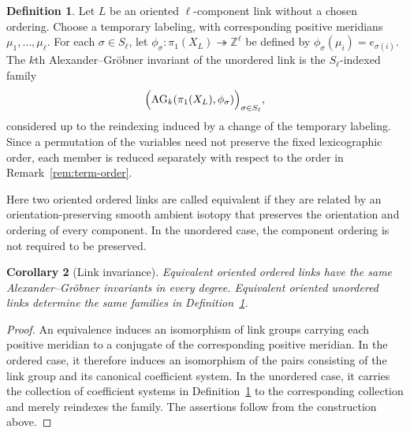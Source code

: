 \documentclass{article}
\theoremstyle{definition}
\newtheorem{definition}{Definition}[section]
\theoremstyle{plain}
\newtheorem{corollary}[definition]{Corollary}
\newcommand{\AG}{\mathrm{AG}}
\newcommand{\Z}{\mathbb{Z}}
\begin{document}
\begin{definition}\label{def:unordered-link-AG}
Let \(L\) be an oriented \(\ell\)-component link without a chosen ordering.
Choose a temporary labeling, with corresponding positive meridians
\(\mu_1,\dots,\mu_\ell\). For each \(\sigma\in S_\ell\), let
\(\phi_\sigma\colon\pi_1(X_L)\twoheadrightarrow\Z^\ell\) be defined by
\(\phi_\sigma(\mu_i)=e_{\sigma(i)}\). 
The \(k\)th Alexander--Gr\"obner invariant of the unordered link
is the \(S_\ell\)-indexed family
\[
\Bigl(
\AG_k(\pi_1(X_L),\phi_\sigma)
\Bigr)_{\sigma\in S_\ell},
\]
considered up to the reindexing induced by a change of the
temporary labeling. Since a
permutation of the variables need not preserve the fixed lexicographic
order, each member is reduced separately with respect to the order in
Remark~\ref{rem:term-order}.
\end{definition}
Here two oriented ordered links are called equivalent if they are
related by an orientation-preserving smooth ambient isotopy that
preserves the orientation and ordering of every component. In the
unordered case, the component ordering is not required to be preserved.
\begin{corollary}[Link invariance]\label{cor:link-invariant}
Equivalent oriented ordered links have the same Alexander--Gr\"obner
invariants in every degree. Equivalent oriented unordered links determine
the same families in Definition~\ref{def:unordered-link-AG}.
\end{corollary}

\begin{proof}
An equivalence induces an isomorphism of link groups carrying each positive
meridian to a conjugate of the corresponding positive meridian. In the
ordered case, it therefore induces an isomorphism of the pairs consisting
of the link group and its canonical coefficient system. In the unordered
case, it carries the collection of coefficient systems in
Definition~\ref{def:unordered-link-AG} to the corresponding collection and
merely reindexes the family. The assertions follow from the construction
above.
\end{proof}
\end{document}
